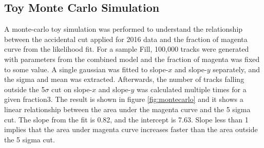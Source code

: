 %
%
%
%
%


\subsection{Toy Monte Carlo Simulation}

A monte-carlo toy simulation was performed to understand the relationship between the accidental cut applied for 2016 data and the fraction of magenta curve from the likelihood fit. For a sample Fill, 100,000 tracks were generated with parameters from the combined model and the fraction of magenta was fixed to some value. A single gaussian was fitted to slope-$x$ and slope-$y$ separately, and the sigma and mean was extracted. Afterwards, the number of tracks falling outside the 5$\sigma$ cut on slope-$x$ and slope-$y$ was calculated multiple times for a given fraction3. The result is shown in figure \ref{fig:montecarlo} and it shows a linear relationship between the area under the magenta curve and the 5 sigma cut. The slope from the fit is 0.82, and the intercept is 7.63. Slope less than 1 implies that the area under magenta curve increases faster than the area outside the 5 sigma cut.


